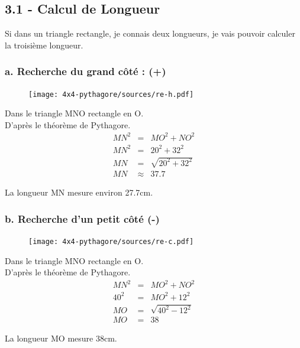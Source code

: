 \documentclass[12pt]{article}
\begin{document}
\subsection*{3.1 - Calcul de Longueur}

Si dans un triangle rectangle, je connais deux longueurs, je vais pouvoir calculer la troisième longueur.

\begin{multicols}{2}

	\subsubsection*{a. Recherche du grand côté : (+)}

	\begin{figure}[H]
		\centering
		\texttt{[image: 4x4-pythagore/sources/re-h.pdf]}
	\end{figure}

	Dans le triangle MNO rectangle en O.\\
	D'après le théorème de Pythagore.
	\begin{eqnarray*}
		MN^2 &=& MO^2 + NO^2 \\
		MN^2 &=& 20^2 + 32^2 \\
		MN   &=& \sqrt{20^2 + 32^2} \\
		MN   &\approx& 37.7
	\end{eqnarray*}

	La longueur MN mesure environ 27.7cm.


\end{multicols}
\begin{multicols}{2}
	\subsubsection*{b. Recherche d'un petit côté (-)}

	\begin{figure}[H]
		\centering
		\texttt{[image: 4x4-pythagore/sources/re-c.pdf]}
	\end{figure}

	Dans le triangle MNO rectangle en O.\\
	D'après le théorème de Pythagore.
	\begin{eqnarray*}
		MN^2 &=& MO^2 + NO^2 \\
		40^2 &=& MO^2 + 12^2 \\
		MO   &=& \sqrt{40^2 - 12^2} \\
		MO   &=& 38
	\end{eqnarray*}

	La longueur MO mesure 38cm.

\end{multicols}
\end{document}
